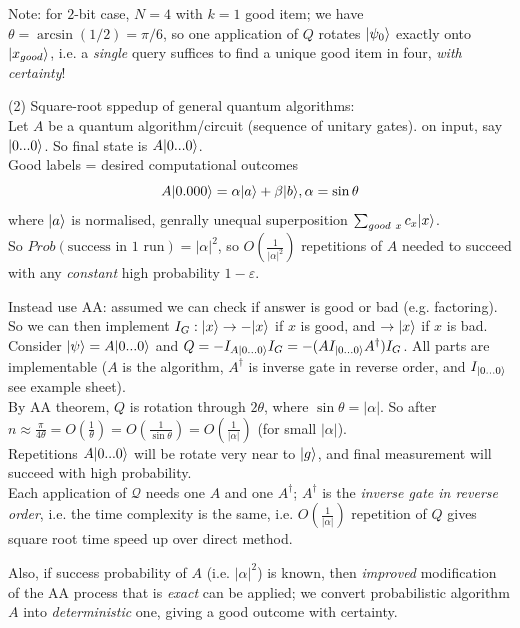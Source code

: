 \documentclass[a4paper]{article}
\begin{document}
Note: for $2$-bit case, $N=4$ with $k=1$ good item; we have $\theta = \arcsin(1/2) = \pi/6$, so one application of $Q$ rotates $|\psi_0\rangle$ exactly onto $|x_{good}\rangle$, i.e. a \emph{single} query suffices to find a unique good item in four, \emph{with certainty}!

(2) Square-root sppedup of general quantum algorithms:\\
Let $A$ be a quantum algorithm/circuit (sequence of unitary gates). on input, say $|0...0\rangle$. So final state is $A|0...0\rangle$.\\
Good labels = desired computational outcomes
$$A|0.000\rangle = \alpha|a\rangle + \beta|b\rangle, \alpha=\sin\theta$$
where $|a\rangle$ is normalised, genrally unequal superposition $\sum_{good\ x} c_x|x\rangle$.\\
So $Prob(\text{success in 1 run}) = |\alpha|^2$, so $O(\frac{1}{|\alpha|^2})$ repetitions of $A$ needed to succeed with any \emph{constant} high probability $1-\varepsilon$.

Instead use AA: assumed we can check if answer is good or bad (e.g. factoring).\\
So we can then implement $I_G:|x\rangle \to -|x\rangle$ if $x$ is good, and $\to |x\rangle$ if $x$ is bad.\\
Consider $|\psi\rangle = A|0...0\rangle$ and $Q=-I_{A|0...0\rangle} I_G = -(AI_{|0...0\rangle} A^\dagger) I_G$. All parts are implementable ($A$ is the algorithm, $A^\dagger$ is inverse gate in reverse order, and $I_{|0...0\rangle}$ see example sheet).\\
By AA theorem, $Q$ is rotation through $2\theta$, where $\sin\theta=|\alpha|$. So after $n\approx \frac{\pi}{4\theta} = O(\frac{1}{\theta}) = O(\frac{1}{\sin\theta}) = O(\frac{1}{|\alpha|})$ (for small $|\alpha|$).\\
Repetitions $A|0...0\rangle$ will be rotate very near to $|g\rangle$, and final measurement will succeed with high probability.\\
Each application of $\mathcal{Q}$ needs one $A$ and one $A^\dagger$; $A^\dagger$ is the \emph{inverse gate in reverse order}, i.e. the time complexity is the same, i.e. $O(\frac{1}{|\alpha|})$ repetition of $Q$ gives square root time speed up over direct method.

Also, if success probability of $A$ (i.e. $|\alpha|^2$) is known, then \emph{improved} modification of the AA process that is \emph{exact} can be applied; we convert probabilistic algorithm $A$ into \emph{deterministic} one, giving a good outcome with certainty.
\end{document}
